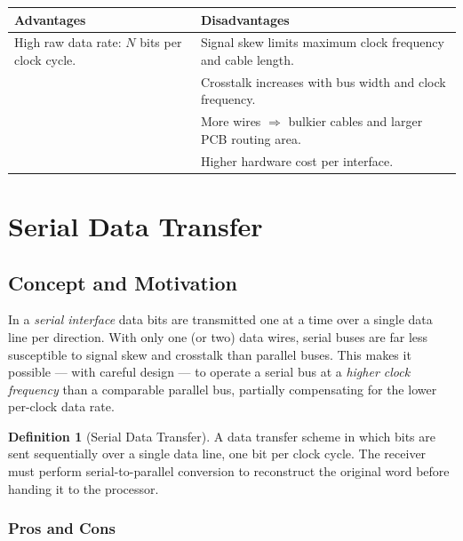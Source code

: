 \documentclass[11pt, a4paper, notitlepage]{report}
\theoremstyle{definition}
\newtheorem{definition}[theorem]{Definition}
\theoremstyle{remark}
\theoremstyle{definition}
\begin{document}
\begin{center}
\renewcommand{\arraystretch}{1.3}
\begin{tabular}{p{} p{}}
  \toprule
  \textbf{Advantages} & \textbf{Disadvantages} \\
  \midrule
  High raw data rate: $N$ bits per clock cycle. &
  Signal skew limits maximum clock frequency and cable length. \\
  & Crosstalk increases with bus width and clock frequency. \\
  & More wires $\Rightarrow$ bulkier cables and larger PCB routing area. \\
  & Higher hardware cost per interface. \\
  \bottomrule
\end{tabular}
\end{center}

\section{Serial Data Transfer}
\label{ch:serial}

\subsection{Concept and Motivation}
\label{sec:serial-concept}

In a \emph{serial interface} data bits are transmitted one at a time over a single data line per direction. With only one (or two) data wires, serial buses are far less susceptible to signal skew and crosstalk than parallel buses. This makes it possible — with careful design — to operate a serial bus at a \emph{higher clock frequency} than a comparable parallel bus, partially compensating for the lower per-clock data rate.

\begin{definition}[Serial Data Transfer]
  \label{def:serial}
  A data transfer scheme in which bits are sent sequentially over a single data line, one bit per clock cycle. The receiver must perform serial-to-parallel conversion to reconstruct the original word before handing it to the processor.
\end{definition}

\subsubsection{Pros and Cons}
\end{document}
